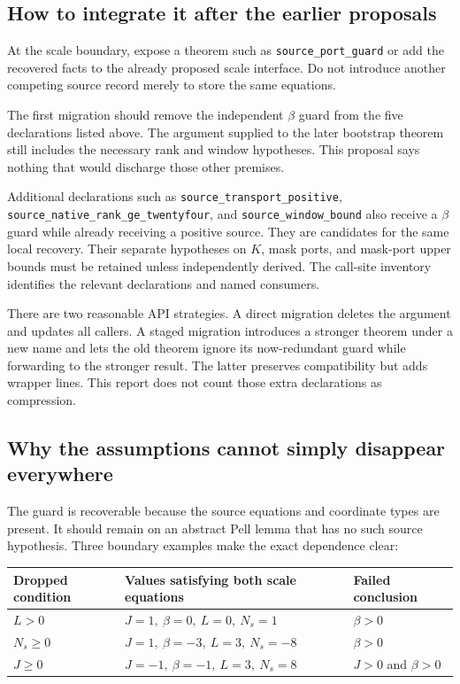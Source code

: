 \documentclass[11pt,letterpaper]{article}
\newcommand{\code}[1]{{\small\urlstyle{tt}\nolinkurl{#1}}}
\begin{document}
\subsection{How to integrate it after the earlier proposals}

At the scale boundary, expose a theorem such as \code{source_port_guard} or add the recovered facts to the already proposed scale interface. Do not introduce another competing source record merely to store the same equations.

The first migration should remove the independent $\beta$ guard from the five declarations listed above. The argument supplied to the later bootstrap theorem still includes the necessary rank and window hypotheses. This proposal says nothing that would discharge those other premises.

Additional declarations such as \code{source_transport_positive}, \code{source_native_rank_ge_twentyfour}, and \code{source_window_bound} also receive a $\beta$ guard while already receiving a positive source. They are candidates for the same local recovery. Their separate hypotheses on $K$, mask ports, and mask-port upper bounds must be retained unless independently derived. The call-site inventory identifies the relevant declarations and named consumers.

There are two reasonable API strategies. A direct migration deletes the argument and updates all callers. A staged migration introduces a stronger theorem under a new name and lets the old theorem ignore its now-redundant guard while forwarding to the stronger result. The latter preserves compatibility but adds wrapper lines. This report does not count those extra declarations as compression.

\subsection{Why the assumptions cannot simply disappear everywhere}

The guard is recoverable because the source equations and coordinate types are present. It should remain on an abstract Pell lemma that has no such source hypothesis. Three boundary examples make the exact dependence clear:

\begin{center}
\begin{tabular}{@{}p{}p{}p{}@{}}
\toprule
Dropped condition & Values satisfying both scale equations & Failed conclusion\\
\midrule
$L>0$ & $J=1,\ \beta=0,\ L=0,\ N_s=1$ & $\beta>0$\\
$N_s\ge0$ & $J=1,\ \beta=-3,\ L=3,\ N_s=-8$ & $\beta>0$\\
$J\ge0$ & $J=-1,\ \beta=-1,\ L=3,\ N_s=8$ & $J>0$ and $\beta>0$\\
\bottomrule
\end{tabular}
\end{center}
\end{document}
